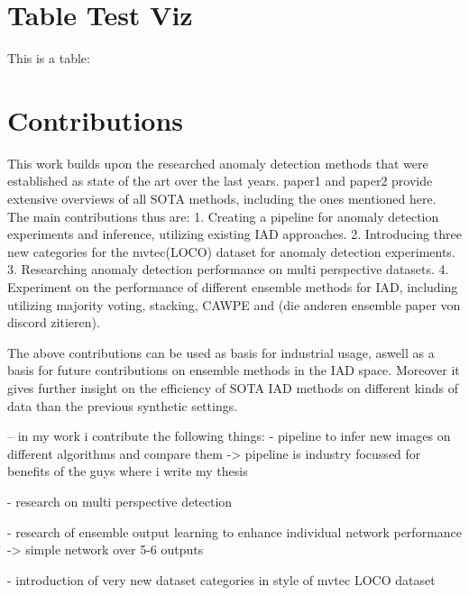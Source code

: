 \section{Table Test Viz}

This is a table:







\section{Contributions}
This work builds upon the researched anomaly detection methods that were established as state of the art over the last years. paper1 and paper2 provide extensive overviews of all SOTA methods,
including the ones mentioned here. The main contributions thus are:
1. Creating a pipeline for anomaly detection experiments and inference, utilizing existing IAD approaches. 
2. Introducing three new categories for the mvtec(LOCO) dataset for anomaly detection experiments.
3. Researching anomaly detection performance on multi perspective datasets.
4. Experiment on the performance of different ensemble methods for IAD, including utilizing majority voting, stacking, CAWPE and (die anderen ensemble paper von discord zitieren).

The above contributions can be used as basis for industrial usage, aswell as a basis for future contributions on ensemble methods in the IAD space. Moreover it gives further insight on the
efficiency of SOTA IAD methods on different kinds of data than the previous synthetic settings.



-- in my work i contribute the following things:
- pipeline to infer new images on different algorithms and compare them
-> pipeline is industry focussed for benefits of the guys where i write my thesis

- research on multi perspective detection

- research of ensemble output learning to enhance individual network performance
-> simple network over 5-6 outputs

- introduction of very new dataset categories in style of mvtec LOCO dataset

